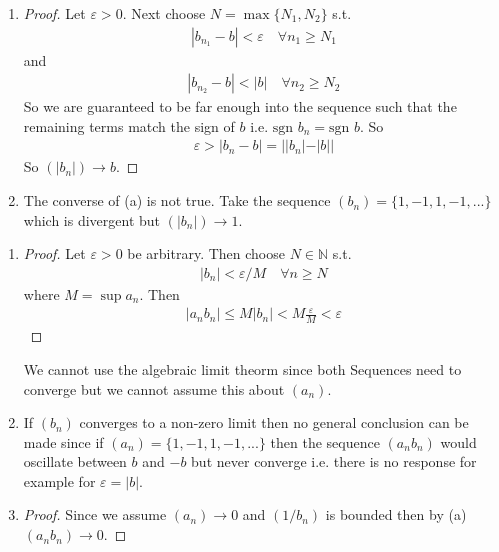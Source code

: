\begin{enumerate}[label=(\alph*)]
    \item 
    \begin{proof}
        Let $\varepsilon > 0$. Next choose $N=\max\{N_1, N_2\}$ s.t.
        \begin{align*}
            |b_{n_1}-b| < \varepsilon \quad \forall n_1 \geq N_1
        \end{align*}
        and  
        \begin{align*}
            |b_{n_2}-b| < |b| \quad \forall n_2 \geq N_2
        \end{align*}
        So we are guaranteed to be far enough into the sequence such that
        the remaining terms match the sign of $b$ i.e. $\text{sgn } b_n = \text{sgn } b$.
        So
        \begin{align*}
            \varepsilon > |b_n-b| = ||b_n| - |b||
        \end{align*}
        So $(|b_n|) \rightarrow b$.
    \end{proof}

    \item 
    The converse of (a) is not true. 
    Take the sequence $(b_n) = \{1,-1,1,-1,...\}$ which is divergent but
    $(|b_n|) \rightarrow 1$.
\end{enumerate}

\begin{enumerate}[label=(\alph*)]
    \item 
    \begin{proof}
        Let $\varepsilon > 0$ be arbitrary. Then choose
         $N \in \mathbb{N}$ s.t. 
         \begin{align*}
            |b_n| < \varepsilon / M \quad \forall n\geq N
         \end{align*}
         where $M = \sup a_n$. Then
         \begin{align*}
            |a_nb_n| \leq M |b_n| < M \frac{\varepsilon}{M} < \varepsilon
         \end{align*}
    \end{proof}
    
    We cannot use the algebraic limit theorm since both Sequences
    need to converge but we cannot assume this about $(a_n)$.

    \item 
    If $(b_n)$ converges to a non-zero limit then no general conclusion can 
    be made since if $(a_n) =\{ 1,-1,1,-1,...\}$ then the sequence $(a_nb_n)$
    would oscillate between $b$ and $-b$ but never converge i.e. there is no
    response for example for $\varepsilon = |b|$.

    \item
    \begin{proof}
        Since we assume $(a_n) \rightarrow 0$ and
        $(1/b_n)$ is bounded then by (a) $(a_nb_n) \rightarrow 0$.
    \end{proof}
\end{enumerate}

